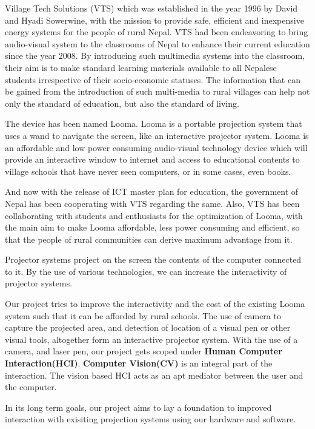 \documentclass[12pt, a4paper]{article}
\begin{document}
Village Tech Solutions (VTS) which was established in the year 1996 by David and Hyadi Sowerwine, with the mission to provide safe, efficient and inexpensive energy systems for the people of rural Nepal. VTS had been endeavoring to bring audio-visual system to the classrooms of Nepal to enhance their current education since the year 2008. By introducing such multimedia systems into the classroom, their aim is to make standard learning materials available to all Nepalese students irrespective of their socio-economic statuses. The information that can be gained from the introduction of such multi-media to rural villages can help not only the
standard of education, but also the standard of living. 

The device has been named Looma. Looma is a portable projection system that uses a wand to navigate the screen, like an interactive projector system. Looma is an affordable and low power consuming audio-visual technology device which will provide an interactive window to internet and access to educational contents to village schools that have never seen computers, or in some cases, even books.

And now with the release of ICT master plan for education, the government
of Nepal has been cooperating with VTS regarding the same. Also, VTS
has been collaborating with students and enthusiasts for the optimization of
Looma, with the main aim to make Looma affordable, less power consuming
and efficient, so that the people of rural communities can derive maximum
advantage from it.

Projector systems project on the screen the contents of the computer connected to it. By the use of various technologies, we can increase the interactivity of projector systems. 

Our project tries to improve the interactivity and the cost of the existing Looma system such that it can be afforded by rural schools. The use of camera to capture the projected area, and detection of location of a visual pen or other visual tools, altogether form an interactive projector system. With the use of a camera, and laser pen, our project gets scoped under \textbf{Human Computer Interaction(HCI)}. \textbf{Computer Vision(CV)} is an integral part of the interaction. The vision based HCI acts as an apt mediator between the user and the computer.

In its long term goals, our project aims to lay a foundation to improved interaction with exisiting projection systems using our hardware and software. 
\end{document}
